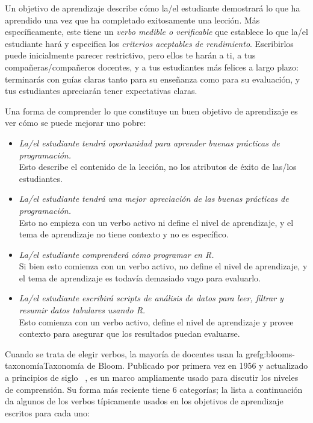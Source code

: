 Un objetivo de aprendizaje describe cómo la/el estudiante demostrará lo que ha aprendido
una vez que ha completado exitosamente una lección.
Más específicamente,
este tiene un \emph{verbo medible o verificable} que establece lo que la/el estudiante hará
y especifica los \emph{criterios aceptables de rendimiento}.
Escribirlos puede inicialmente parecer restrictivo,
pero ellos te harán a ti,
a tus compañeras/compañeros docentes,
y a tus estudiantes más felices a largo plazo:
terminarás con guías claras tanto para su enseñanza como para su evaluación,
y tus estudiantes apreciarán tener expectativas claras.

Una forma de comprender lo que constituye un buen objetivo de aprendizaje
es ver cómo se puede mejorar uno pobre:

 \begin{itemize}
 
\item
  \emph{La/el estudiante tendrá oportunidad para aprender buenas prácticas de programación.}\\
Esto describe el contenido de la lección,
no los atributos de éxito de las/los estudiantes.\\
 
\item
  \emph{La/el estudiante tendrá una mejor apreciación
de las buenas prácticas de programación.}\\
 Esto no empieza con un verbo activo ni define el nivel de aprendizaje,
y el tema de aprendizaje no tiene contexto y no es específico.\\
 
\item
  \emph{La/el estudiante comprenderá cómo programar en R.}\\
  Si bien esto comienza con un verbo activo,
   no define el nivel de aprendizaje,
  y el tema de aprendizaje es todavía demasiado vago para evaluarlo.\\
 
\item
  \emph{La/el estudiante escribirá scripts de análisis de datos para leer, filtrar y resumir datos tabulares usando R.}\\
 Esto comienza con un verbo activo,
define el nivel de aprendizaje
y provee contexto para asegurar que los resultados puedan evaluarse.
\end{itemize}
 
Cuando se trata de elegir verbos,
la mayoría de docentes usan la gref{g:blooms-taxonomía}{Taxonomía de Bloom}.
Publicado por primera vez en 1956 y actualizado a principios de siglo ~\cite{Ande2001},
es un marco ampliamente usado para discutir los niveles de comprensión.
Su forma más reciente tiene 6 categorías;
la lista a continuación da algunos de los verbos típicamente usados en los objetivos de aprendizaje escritos para cada uno:



